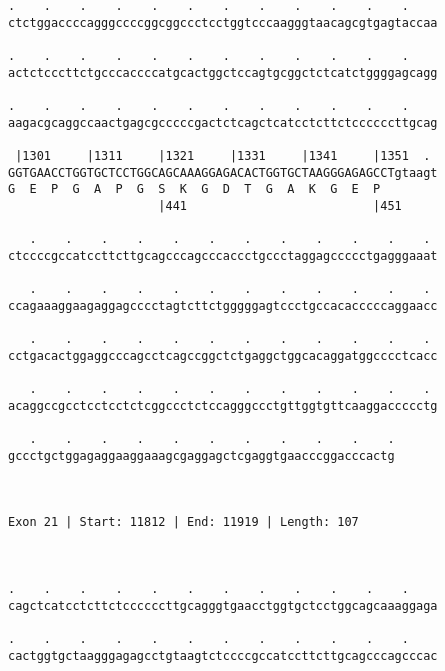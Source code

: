 \documentclass{article}
\begin{document}
\begin{Verbatim}
.    .    .    .    .    .    .    .    .    .    .    .    
ctctggaccccagggccccggcggccctcctggtcccaagggtaacagcgtgagtaccaa
                                                            
.    .    .    .    .    .    .    .    .    .    .    .    
actctcccttctgcccaccccatgcactggctccagtgcggctctcatctggggagcagg
                                                            
.    .    .    .    .    .    .    .    .    .    .    .    
aagacgcaggccaactgagcgcccccgactctcagctcatcctcttctccccccttgcag
                                                            
 |1301     |1311     |1321     |1331     |1341     |1351  . 
GGTGAACCTGGTGCTCCTGGCAGCAAAGGAGACACTGGTGCTAAGGGAGAGCCTgtaagt
G  E  P  G  A  P  G  S  K  G  D  T  G  A  K  G  E  P        
                     |441                          |451     
  
   .    .    .    .    .    .    .    .    .    .    .    . 
ctccccgccatccttcttgcagcccagcccaccctgccctaggagccccctgagggaaat
                                                            
   .    .    .    .    .    .    .    .    .    .    .    . 
ccagaaaggaagaggagcccctagtcttctgggggagtccctgccacacccccaggaacc
                                                            
   .    .    .    .    .    .    .    .    .    .    .    . 
cctgacactggaggcccagcctcagccggctctgaggctggcacaggatggcccctcacc
                                                            
   .    .    .    .    .    .    .    .    .    .    .    . 
acaggccgcctcctcctctcggccctctccagggccctgttggtgttcaaggaccccctg
                                                            
   .    .    .    .    .    .    .    .    .    .    .
gccctgctggagaggaaggaaagcgaggagctcgaggtgaacccggacccactg
                                                      
                                                      
 
Exon 21 | Start: 11812 | End: 11919 | Length: 107



.    .    .    .    .    .    .    .    .    .    .    .    
cagctcatcctcttctccccccttgcagggtgaacctggtgctcctggcagcaaaggaga
                                                            
.    .    .    .    .    .    .    .    .    .    .    .    
cactggtgctaagggagagcctgtaagtctccccgccatccttcttgcagcccagcccac
                                                            

\end{Verbatim}
\end{document}
